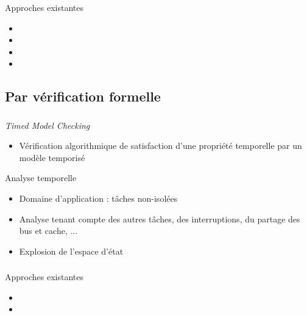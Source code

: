 \documentclass{beamer}
\begin{document}
  \begin{frame}
    \frametitle{\secname}
    \framesubtitle{\subsecname}

    \begin{exampleblock}{Approches existantes}
      \tiny
      \begin{itemize}
        \item {}
        \item {}
        \item {}
        \item {}
      \end{itemize}
    \end{exampleblock}
  \end{frame}

  \subsection{Par vérification formelle}
  \begin{frame}
    \frametitle{\secname}
    \framesubtitle{\subsecname}

    \begin{block}{\textit{Timed Model Checking}}
      \begin{itemize}
        \item Vérification algorithmique de satisfaction d'une propriété
          temporelle par un modèle temporisé
      \end{itemize}
    \end{block}

    \begin{block}{Analyse temporelle}
      \begin{itemize}
        \item Domaine d'application : tâches non-isolées
        \item Analyse tenant compte des autres tâches, des interruptions, du
          partage des bus et cache, ...
        \item Explosion de l'espace d'état
      \end{itemize}
    \end{block}
  \end{frame}

  \begin{frame}
    \frametitle{\secname}
    \framesubtitle{\subsecname}
    \begin{exampleblock}{Approches existantes}
      \tiny
      \begin{itemize}
        \item {}
        \item {}
      \end{itemize}
    \end{exampleblock}
  \end{frame}
\end{document}
